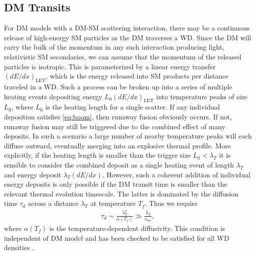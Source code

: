 \documentclass[twocolumn,preprintnumbers,amsmath,amssymb,prl, superscriptaddress]{revtex4}
\begin{document}
\subsection{DM Transits}
\label{sec:DMdecay}

For DM models with a DM-SM scattering interaction, there may be a continuous release of high-energy SM particles as the DM traverses a WD.
Since the DM will carry the bulk of the momentum in any such interaction producing light, relativistic SM secondaries, we can assume that the momentum of the released particles is isotropic.
This is parameterized by a linear energy transfer $(dE/dx)_\text{LET}$, which is the energy released into SM products per distance traveled in a WD.
Such a process can be broken up into a series of multiple heating events depositing energy $L_0 (d E/d x)_\text{LET}$ into temperature peaks of size $L_0$, where $L_0$ is the heating length for a single scatter.
If any individual deposition satisfies \eqref{eq:boom}, then runaway fusion obviously occurs.
If not, runaway fusion may still be triggered due to the combined effect of many deposits.
In such a scenario a large number of nearby temperature peaks will each diffuse outward, eventually merging into an explosive thermal profile.
More explicitly, if the heating length is smaller than the trigger size $L_0 < \lambda_T$ it is sensible to consider the combined deposit as a single heating event of length $\lambda_T$ and energy deposit $\lambda_T (d E/d x)$.
However, such a coherent addition of individual energy deposits is only possible if the DM transit time is smaller than the relevant thermal evolution timescale.
The latter is dominated by the diffusion time $\tau_d$ across a distance $\lambda_T$ at temperature $T_f$.
Thus we require
\begin{align}
\tau_d \sim \frac{\lambda_T^2}{\alpha(T_f)} \gg \frac{\lambda_T}{v_\text{esc}},
\label{eq:SlowDiffusion}
\end{align}
where $\alpha(T_f)$ is the temperature-dependent diffusivity.
This condition is independent of DM model and has been checked to be satisfied for all WD densities \cite{Woosley}.
\end{document}
